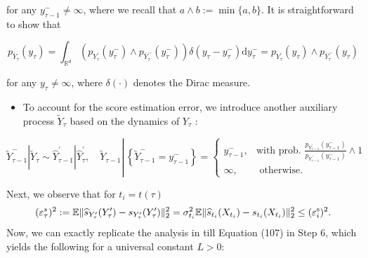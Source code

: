 \documentclass{article}
\theoremstyle{plain}
\theoremstyle{definition}
\theoremstyle{remark}
\newcommand{\red}[1]{{\color{red}#1}}
\def\bbE{\mathbb{E}}
\def\Norm#1{\Vert#1\Vert}
\def\evel{\varepsilon^{\rm v}}
\def\escore{\varepsilon^{\rm s}}
\begin{document}
for any $y_{\tau - 1}^{-} \neq \infty$, where we recall that $a \wedge b:=\min \{a, b\}$. It is straightforward to show that


\begin{equation}
\label{eq: pdf of aux process bar_Y}
p_{\bar{Y}_{\tau}}\left(y_{\tau}\right)=\int_{\mathbb{R}^{d}}\left(p_{Y^\prime_{\tau}}\left(y_{\tau}^{-}\right) \wedge p_{\bar{Y}_{\tau}^{-}}\left(y_{\tau}^{-}\right)\right) \delta\left(y_{\tau}-y_{\tau}^{-}\right) \mathrm{d} y_{\tau}^{-}=p_{Y^\prime_{\tau}}\left(y_{\tau}\right) \wedge p_{\bar{Y}_{\tau}^{-}}\left(y_{\tau}\right) 
\end{equation}


for any $y_{\tau} \neq \infty$, where $\delta(\cdot)$ denotes the Dirac measure.

\begin{itemize}
  \item To account for the score estimation error, we introduce another auxiliary process $\widetilde{Y}_{\tau}$ based on the dynamics of $Y_{\tau}$ :
\end{itemize}

\begin{equation}
\label{eq: aux process hat_Y}
\widetilde{Y}_{\tau - 1}^{-}\left|\widetilde{Y}_{\tau} \sim \hat Y^\prime_{\tau - 1}\right| \hat Y^\prime_{\tau}, \quad \widetilde{Y}_{\tau - 1} \left\lvert\,\left\{\widetilde{Y}_{\tau - 1}^{-}=y_{\tau - 1}^{-}\right\}= \begin{cases}y_{\tau - 1}^{-}, & \text {with prob. } \frac{p_{Y^\prime_{\tau - 1}}\left(y_{\tau - 1}^{-}\right)}{p_{\bar{Y}_{\tau - 1}^{-}}\left(y_{\tau - 1}^{-}\right)} \wedge 1 \\ \infty, & \text { otherwise. }\end{cases}\right.
\end{equation}



 Next, we observe that for $t_i = t(\tau)$ 
 \begin{equation}
     \label{eq: score error equivalence}
      (\varepsilon^s_\tau)^2 := \bbE \Norm{\widehat s_{Y^\prime_{\tau}}(Y^\prime_{\tau}) - s_{Y^\prime_{\tau}}(Y^\prime_{\tau})}_2^2  = \sigma_{t_i}^2 \bbE \Norm{ \widehat s_{t_i}(X_{t_i}) - s_{t_i}(X_{t_i})}_2^2  \le (\escore_i)^2.
 \end{equation}
 Now, we can exactly replicate the analysis in \citet[Section C.2]{liang2025low} till Equation (107) in Step 6, which yields the following for a universal constant $L>0$:
\end{document}
